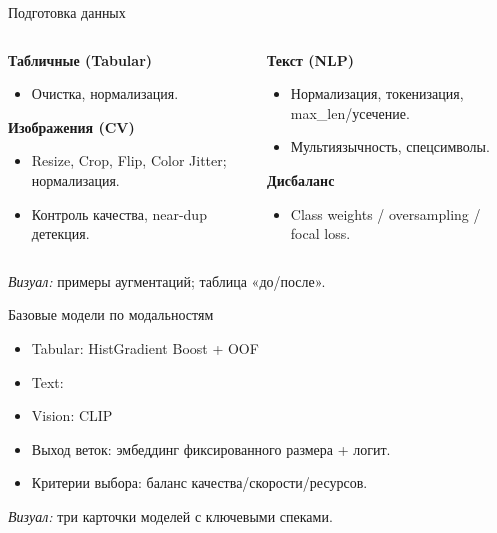 \documentclass[aspectratio=169,10pt]{beamer}
\newcommand{\cv}[1]{\textcolor{CVColor}{#1}}
\newcommand{\nlp}[1]{\textcolor{NLPColor}{#1}}
\newcommand{\tabmod}[1]{\textcolor{TABColor}{#1}}
\begin{document}
\begin{frame}{Подготовка данных}
\begin{columns}[T,onlytextwidth]
\begin{column}{0.5\textwidth}
\textbf{Табличные (\tabmod{Tabular})}
\begin{itemize}
  \item Очистка, нормализация.
\end{itemize}
\textbf{Изображения (\cv{CV})}
\begin{itemize}
  \item Resize, Crop, Flip, Color Jitter; нормализация.
  \item Контроль качества, near-dup детекция.
\end{itemize}
\end{column}
\begin{column}{0.5\textwidth}
\textbf{Текст (\nlp{NLP})}
\begin{itemize}
  \item Нормализация, токенизация, max\_len/усечение.
  \item Мультиязычность, спецсимволы.
\end{itemize}
\textbf{Дисбаланс}
\begin{itemize}
  \item Class weights / oversampling / focal loss.
\end{itemize}
\end{column}
\end{columns}
\medskip
\textit{Визуал:} примеры аугментаций; таблица «до/после».
\end{frame}

\begin{frame}{Базовые модели по модальностям}
\begin{itemize}
  \item \tabmod{Tabular}: HistGradient Boost + OOF
  \item \nlp{Text}: 
  \item \cv{Vision}: CLIP
  \item Выход веток: эмбеддинг фиксированного размера + логит.
  \item Критерии выбора: баланс качества/скорости/ресурсов.
\end{itemize}
\medskip
\textit{Визуал:} три карточки моделей с ключевыми спеками.
\end{frame}
\end{document}
